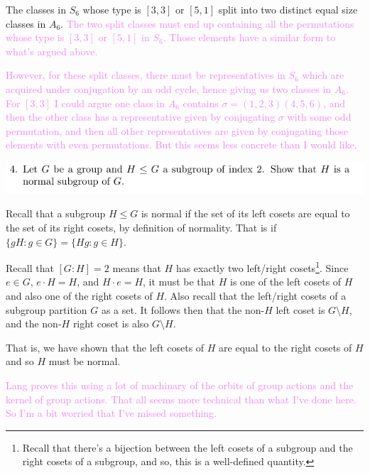 \documentclass[12pt,letterpaper,boxed]{hmcpset}
\newcommand{\wg}[1]{\textcolor{violet}{#1}}
\begin{document}
\begin{solution}
The classes in $S_6$ whose type is $[3,3]$ or $[5,1]$ split into two distinct
equal size classes in $A_6$. 
\wg{The two split classes must end up containing all the permutations 
whose type is $[3,3]$ or $[5,1]$ in $S_6$. Those elements have a
similar form to what's argued above.}

\wg{
However, for these split classes, there must be
representatives in $S_6$ which are acquired under conjugation by an odd cycle,
hence giving us two classes in $A_6$. For $[3,3]$ I could argue one
class in $A_6$ contains $\sigma = (1,2,3)(4,5,6)$, and then the other class has
a representative given by conjugating $\sigma$ with some odd
permutation, and then all other representatives are given by
conjugating those elements with even permutations. But this seems less
concrete than I would like.}

\end{solution}

\newpage


\begin{problem}
	\includegraphics[scale=0.8]{4.png}
	\hfill
\end{problem}

\begin{solution}
Recall that a subgroup $H \leq G$ is normal if the set of
its left cosets are equal to the set of its right cosets, by
definition of normality. That is if
$\{g H : g \in G\} = \{H g : g \in H\}$. 

Recall that $[G: H] = 2$ means that $H$ has exactly two left/right
cosets\footnote{Recall that there's a bijection between the left
cosets of a subgroup and the right cosets of a subgroup, and so, this
is a well-defined quantity.}. Since $e \in G$, $e \cdot H = H$, and $H
\cdot e = H$, it
must be that $H$ is
one of the left cosets of $H$ and also one of the right cosets of $H$.
Also recall that the left/right cosets of a subgroup partition $G$ as
a set. It follows then that the non-$H$
left coset is $G \setminus H$, and the non-$H$ right coset is also $G
\setminus H$.

That is, we have shown that the left cosets of $H$ are equal to the right cosets of $H$
and so $H$ must be normal. 

\wg{Lang proves this using a lot of machinary of the orbits of group
actions and the kernel of group actions. That all seems more technical
than what I've done here. So I'm a bit worried that I've missed
something.}
\end{solution}
\end{document}
